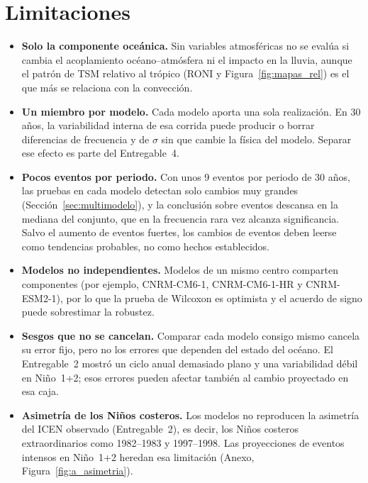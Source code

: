 \documentclass[11pt,a4paper]{article}
\begin{document}
\section{Limitaciones}
\label{sec:limitaciones}

\begin{itemize}[nosep]
\item \textbf{Solo la componente oceánica.} Sin variables atmosféricas no se evalúa si cambia el acoplamiento océano--atmósfera ni el impacto en la lluvia, aunque el patrón de TSM relativo al trópico (RONI y Figura~\ref{fig:mapas_rel}) es el que más se relaciona con la convección.
\item \textbf{Un miembro por modelo.} Cada modelo aporta una sola realización.
En 30 años, la variabilidad interna de esa corrida puede producir o borrar diferencias de frecuencia y de $\sigma$ sin que cambie la física del modelo.
Separar ese efecto es parte del Entregable~4.
\item \textbf{Pocos eventos por periodo.} Con unos 9 eventos por periodo de 30 años, las pruebas en cada modelo detectan solo cambios muy grandes (Sección~\ref{sec:multimodelo}), y la conclusión sobre eventos descansa en la mediana del conjunto, que en la frecuencia rara vez alcanza significancia.
Salvo el aumento de eventos fuertes, los cambios de eventos deben leerse como tendencias probables, no como hechos establecidos.
\item \textbf{Modelos no independientes.} Modelos de un mismo centro comparten componentes (por ejemplo, CNRM-CM6-1, CNRM-CM6-1-HR y CNRM-ESM2-1), por lo que la prueba de Wilcoxon es optimista y el acuerdo de signo puede sobrestimar la robustez.
\item \textbf{Sesgos que no se cancelan.} Comparar cada modelo consigo mismo cancela su error fijo, pero no los errores que dependen del estado del océano.
El Entregable~2 mostró un ciclo anual demasiado plano y una variabilidad débil en Niño~1+2; esos errores pueden afectar también al cambio proyectado en esa caja.
\item \textbf{Asimetría de los Niños costeros.} Los modelos no reproducen la asimetría del ICEN observado (Entregable~2), es decir, los Niños costeros extraordinarios como 1982--1983 y 1997--1998.
Las proyecciones de eventos intensos en Niño~1+2 heredan esa limitación (Anexo, Figura~\ref{fig:a_asimetria}).
\end{itemize}
\end{document}
